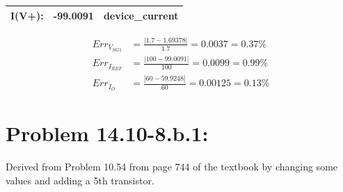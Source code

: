 \documentclass[12pt,letterpaper,titlepage]{article}
\begin{document}
\begin{raggedright}
\begin{center}
\begin{paracol}{2}
\begin{tabular}{|l|l|c|}
\\\hline I(V+):	   & -99.0091	   & device\_current
\\\hline
\end{tabular}
\end{paracol}
\begin{align*}
   Err_{V_{SG1}} &= \frac{|1.7-1.69378|}{1.7} = 0.0037 = 0.37\%
\\ Err_{I_{REF}} &= \frac{|100-99.0091|}{100} = 0.0099 = 0.99\%
\\ Err_{I_O} &= \frac{|60-59.9248|}{60} = 0.00125 = 0.13\%
\end{align*}
\end{center}

\clearpage
\section{Problem 14.10-8.b.1: } Derived from Problem 10.54 from page 744 of the textbook by changing some values and adding a 5th transistor.


\end{raggedright}
\end{document}
